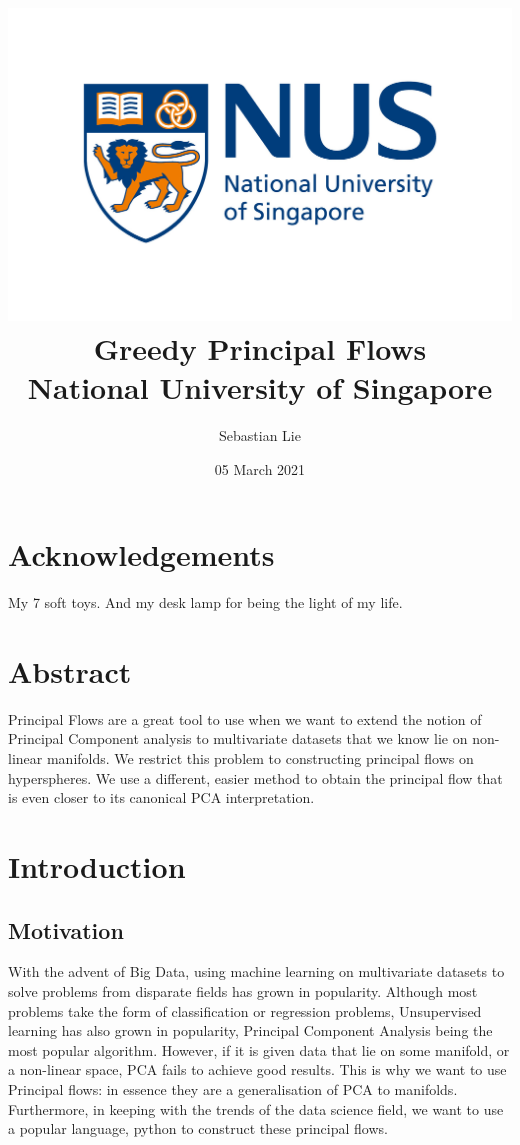 \documentclass[12pt]{report}
\begin{document}
\title{
{\includegraphics[width=0.7\columnwidth]{university.jpg}}\\
{Greedy Principal Flows}\\
{\large National University of Singapore}\\
}
\author{Sebastian Lie}
\date{05 March 2021}
\maketitle

\chapter*{Acknowledgements}
My 7 soft toys. And my desk lamp for being the light of my life.

\chapter*{Abstract}
Principal Flows are a great tool to use when we want to extend the 
notion of Principal Component analysis to multivariate datasets that 
we know lie on non-linear manifolds. 
We restrict this problem to constructing principal flows on hyperspheres. 
We use a different, easier method to obtain the principal flow 
that is even closer to its canonical PCA interpretation. 

\newpage
\tableofcontents
\newpage

\chapter{Introduction}

\section{Motivation}

With the advent of Big Data, using machine learning on multivariate datasets 
to solve problems from disparate fields has grown in popularity. Although 
most problems take the form of classification or regression problems, 
Unsupervised learning has also grown in popularity, 
Principal Component Analysis being the most popular algorithm. 
However, if it is given data that lie on some manifold, or a non-linear space, 
PCA fails to achieve good results. 
This is why we want to use Principal flows: 
in essence they are a generalisation of PCA to manifolds. 
Furthermore, in keeping with the trends of the data science field, 
we want to use a popular language, python to construct these principal flows.
\end{document}
